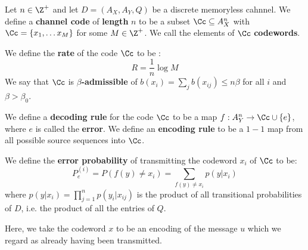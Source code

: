 \begin{definition}
    Let $n \in \Z^+$ and let  $D=(A_X,A_Y,Q)$ be a discrete memoryless cahnnel.
    We define a \textbf{channel code} of \textbf{length} $n$ to be a subset $\Cc
    \subseteq A_X^n$ with $\Cc=\{x_1, \dots x_M\}$ for some $M \in \Z^+$. We
    call the elements of  $\Cc$  \textbf{codewords}.

    We define the \textbf{rate} of the code $\Cc$ to be :
    \begin{equation}
        R=\frac{1}{n}\log{M}
    \end{equation}
    We say that $\Cc$ is  \textbf{$\beta$-admissible} of
    $b(x_i)=\sum_{j}{b(x_{ij})} \leq n\beta$ for all $i$ and  $\beta>\beta_0$.

    We define a  \textbf{decoding rule} for the code $\Cc$ to be a map  $f:A_Y^n
    \rightarrow \Cc \cup \{e\}$, where $e$ is called the \textbf{error}. We
    define an \textbf{encoding rule} to be a $1-1$ map from all possible source
    sequences into $\Cc$.

    We define the \textbf{error probability} of transmitting the codeword $x_i$
    of $\Cc$ to be:
    \begin{equation}
        P_e^{(i)}=P(f(y) \neq x_i)=\sum_{f(y) \neq x_i}{p(y|x_i)}
    \end{equation}
    where $p(y|x_i)=\prod_{j=1}^n{p(y_i|x_{ij})}$ is the product of all
    transitional probabilities of $D$, i.e. the product of all the entries of
    $Q$.
\end{definition}
\begin{remark}
    Here, we take the codeword $x$ to be an encoding of the message $u$ which
    we regard as already having been transmitted.
\end{remark}

